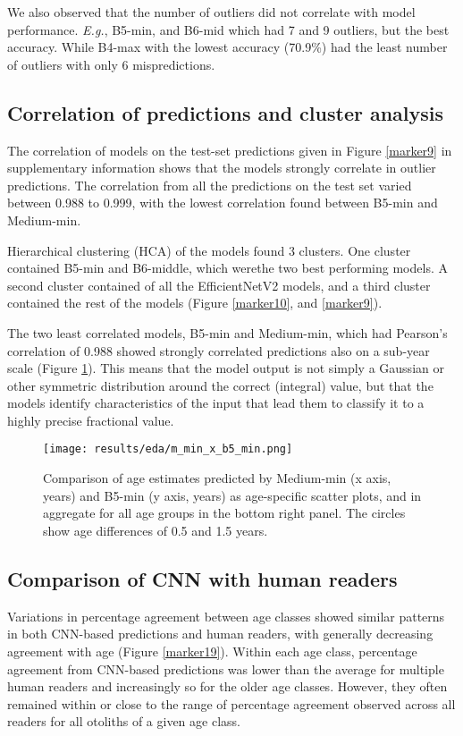 \documentclass[10pt,letterpaper]{article}
\begin{document}
We also observed that the number of  outliers did not correlate with model performance. \textit{E.g.}, B5-min, and B6-mid which had 7 and 9 outliers, but the best  accuracy. While B4-max with the lowest accuracy (70.9\%) had the least number of outliers with only 6 mispredictions.

\subsection{Correlation of predictions and cluster analysis}

The correlation of models on the test-set predictions given in Figure \ref{marker9} in supplementary information shows that the models strongly correlate in outlier predictions. 
The correlation from all the predictions on the test set varied between 0.988 to 0.999, with the lowest correlation found between B5-min and Medium-min. 

Hierarchical clustering (HCA) of the models found 3 clusters. One cluster contained B5-min and B6-middle, which werethe two best performing models. A second cluster contained of all the EfficientNetV2 models, and a third cluster contained the rest of the models (Figure \ref{marker10}, and \ref{marker9}).

The two least correlated models, B5-min and Medium-min, which had Pearson's correlation of 0.988 showed strongly correlated predictions also on a sub-year scale (Figure \ref{marker12}).  This means that the model output is not simply a Gaussian or other symmetric distribution around the correct (integral) value, but that the models identify characteristics of the input that lead them to classify it to a highly precise fractional value.

\begin{figure}[hbtp!]
  \centering
  \texttt{[image: results/eda/m\_min\_x\_b5\_min.png]}
    \caption{Comparison of age estimates predicted by Medium-min (x axis, years) and B5-min (y axis, years) as age-specific scatter plots, and in aggregate for all age groups  in the bottom right panel.  The circles show age differences of 0.5 and 1.5 years.}
  \label{marker12}
\end{figure}

\subsection{Comparison of CNN with human readers}
Variations in percentage agreement between age classes showed similar patterns in both CNN-based predictions and human readers, with generally decreasing agreement with age (Figure \ref{marker19}). Within each age class, percentage agreement from CNN-based predictions was lower than the average for multiple human readers and increasingly so for the older age classes. However, they often remained within or close to the range of percentage agreement observed across all readers for all otoliths of a given age class. 
\end{document}
